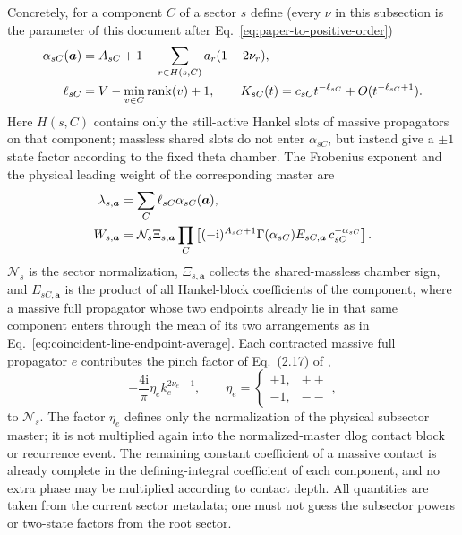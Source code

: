 \documentclass[11pt,a4paper]{article}
\newcommand{\ii}{\mathrm i}
\newcommand{\cN}{\mathcal N}
\begin{document}
Concretely, for a component $C$ of a sector $s$ define (every $\nu$ in this subsection is the parameter of this document after Eq.~\eqref{eq:paper-to-positive-order})
\begin{align}
 \alpha_{sC}(\bm a)&=A_{sC}+1-
 \sum_{r\in H(s,C)}a_r(1-2\nu_r),
 \notag\\
 \ell_{sC}&=V-\min_{v\in C}\operatorname{rank}(v)+1,
 \qquad
 K_{sC}(t)=c_{sC}t^{-\ell_{sC}}+O(t^{-\ell_{sC}+1}).
 \label{eq:generic-sector-boundary-component}
\end{align}
Here $H(s,C)$ contains only the still-active Hankel slots of massive propagators on that component; massless shared slots do not enter $\alpha_{sC}$, but instead give a $\pm1$ state factor according to the fixed theta chamber. The Frobenius exponent and the physical leading weight of the corresponding master are
\begin{align}
 \lambda_{s,\bm a}&=\sum_C\ell_{sC}\alpha_{sC}(\bm a),
 \notag\\
 W_{s,\bm a}&=\cN_s\Xi_{s,\bm a}
 \prod_C\left[
 (-\ii)^{A_{sC}+1}\Gamma(\alpha_{sC})
 E_{sC,\bm a}\,c_{sC}^{-\alpha_{sC}}
 \right].
 \label{eq:generic-sector-boundary-weight}
\end{align}
$\cN_s$ is the sector normalization, $\Xi_{s,\bm a}$ collects the shared-massless chamber sign, and $E_{sC,\bm a}$ is the product of all Hankel-block coefficients of the component, where a massive full propagator whose two endpoints already lie in that same component enters through the mean of its two arrangements as in Eq.~\eqref{eq:coincident-line-endpoint-average}. Each contracted massive full propagator $e$ contributes the pinch factor of Eq.~(2.17) of \cite{Chen:2024jms},
\begin{equation}
 -\frac{4\ii}{\pi}\eta_e k_e^{2\nu_e-1},
 \qquad
 \eta_e=\begin{cases}+1,&++\\-1,&--\end{cases},
 \label{eq:massive-full-pinch-normalization}
\end{equation}
to $\cN_s$. The factor $\eta_e$ defines only the normalization of the physical subsector master; it is not multiplied again into the normalized-master dlog contact block or recurrence event. The remaining constant coefficient of a massive contact is already complete in the defining-integral coefficient of each component, and no extra phase may be multiplied according to contact depth. All quantities are taken from the current sector metadata; one must not guess the subsector powers or two-state factors from the root sector.
\end{document}
